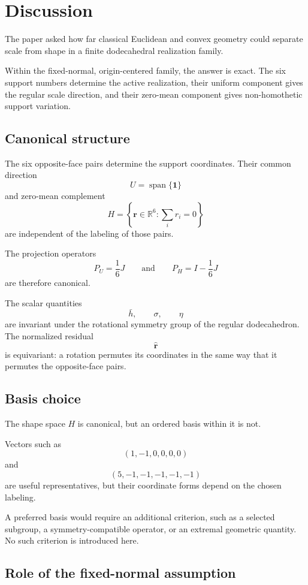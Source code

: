 \section{Discussion}

The paper asked how far classical Euclidean and convex geometry could
separate scale from shape in a finite dodecahedral realization family.

Within the fixed-normal, origin-centered family, the answer is exact. The
six support numbers determine the active realization, their uniform
component gives the regular scale direction, and their zero-mean component
gives non-homothetic support variation.

\subsection{Canonical structure}

The six opposite-face pairs determine the support coordinates. Their common
direction
\[
U=\operatorname{span}\{\mathbf 1\}
\]
and zero-mean complement
\[
H=
\left\{
\mathbf r\in\mathbb R^6:
\sum_i r_i=0
\right\}
\]
are independent of the labeling of those pairs.

The projection operators
\[
P_U=\frac{1}{6}J
\qquad\text{and}\qquad
P_H=I-\frac{1}{6}J
\]
are therefore canonical.

The scalar quantities
\[
\bar h,
\qquad
\sigma,
\qquad
\eta
\]
are invariant under the rotational symmetry group of the regular
dodecahedron. The normalized residual
\[
\widehat{\mathbf r}
\]
is equivariant: a rotation permutes its coordinates in the same way that it
permutes the opposite-face pairs.

\subsection{Basis choice}

The shape space \(H\) is canonical, but an ordered basis within it is not.

Vectors such as
\[
(1,-1,0,0,0,0)
\]
and
\[
(5,-1,-1,-1,-1,-1)
\]
are useful representatives, but their coordinate forms depend on the
chosen labeling.

A preferred basis would require an additional criterion, such as a selected
subgroup, a symmetry-compatible operator, or an extremal geometric
quantity. No such criterion is introduced here.

\subsection{Role of the fixed-normal assumption}

